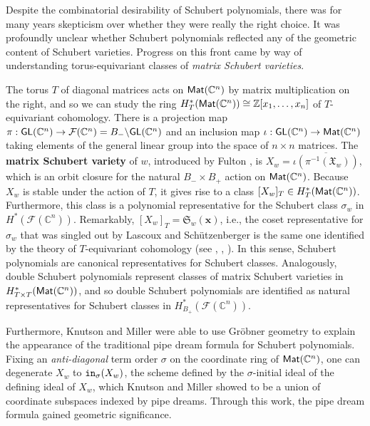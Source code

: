 \documentclass[12pt,reqno]{amsart}
\newtheorem{Main Conjecture}[theorem]{Main Conjecture}
\theoremstyle{remark}
\theoremstyle{plain}
\newcommand{\mydef}[1]{{\bf #1}}
\newcommand{\notdefterm}[1]{\emph{#1}}
\newcommand{\init}{{\tt in}}
\newcommand{\CC}{\mathbb{C}}
\newcommand{\mat}{{\sf Mat}}
\newcommand{\fl}{{\mathcal F}}
\newcommand{\GL}{{\sf GL}}
\begin{document}
Despite the combinatorial desirability of Schubert polynomials, there was for many years skepticism over whether they were really the right choice.   It was profoundly unclear whether Schubert polynomials reflected any of the geometric content of Schubert varieties. Progress on this front came by way of understanding torus-equivariant classes of \notdefterm{matrix Schubert varieties}.  

 The torus $T$ of diagonal matrices acts on $\mat(\mathbb C^n)$ by matrix multiplication on the right, and so we can study the ring $H^*_T(\mat(\mathbb C^n))\cong \mathbb Z[x_1,\ldots,x_n]$ of $T$-equivariant cohomology.
There is a projection map $\pi:\GL(\mathbb C^n)\rightarrow \fl(\CC^n)=B_-\backslash \GL(\CC^n)$ and an inclusion map $\iota:\GL(\mathbb C^n)\rightarrow \mat(\mathbb C^n)$ taking elements of the general linear group into the space of $n\times n$ matrices.  The 
\mydef{matrix Schubert variety} of $w$, introduced by Fulton \cite{Ful92}, is $X_w=\overline{\iota(\pi^{-1}(\mathfrak X_w))}$, which is an orbit closure for the natural $B_-\times B_+$ action on $\mat(\mathbb C^n)$. Because $X_w$ is stable under the action of $T$, it gives rise to a class $[X_w]_T\in H^*_T(\mat(\mathbb C^n))$.  Furthermore, this class is a polynomial representative for the Schubert class $\sigma_w$ in $H^*(\fl(\CC^n))$.  Remarkably, $[X_w]_T=\mathfrak S_w(\mathbf x)$, i.e., the coset representative for $\sigma_w$ that was singled out by Lascoux and Sch\"utzenberger is the same one identified by the theory of $T$-equivariant cohomology (see \cite{Ful92}, \cite[Theorem~4.2]{FR03}, \cite[Theorem~A]{KM05}).  In this sense, Schubert polynomials are canonical representatives for Schubert classes.  Analogously, double Schubert polynomials represent classes of matrix Schubert varieties in $H^*_{T\times T}(\mat(\mathbb C^n))$, and so double Schubert polynomials are identified as natural representatives for Schubert classes in $H_{B_+}^*(\fl(\CC^n))$. 

Furthermore, Knutson and Miller \cite{KM05} were able to use Gr\"obner geometry to explain the appearance of the traditional pipe dream formula for Schubert polynomials.  Fixing an \emph{anti-diagonal} term order $\sigma$ on the coordinate ring of $\mat(\mathbb C^n)$, one can degenerate $X_w$ to $\init_\sigma(X_w)$,  the scheme defined by the $\sigma$-initial ideal of the defining ideal of $X_w$, which Knutson and Miller showed to be a union of coordinate subspaces indexed by pipe dreams.  Through this work, the pipe dream formula gained geometric significance.
\end{document}
